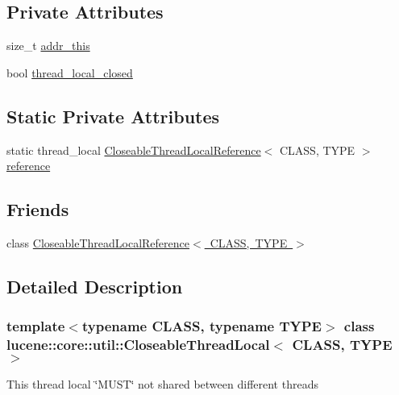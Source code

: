 \subsection*{Private Attributes}
\begin{DoxyCompactItemize}
\item 
size\+\_\+t \mbox{\hyperlink{classlucene_1_1core_1_1util_1_1CloseableThreadLocal_a69309dee1e58cf91dbcac2cacf382dcd}{addr\+\_\+this}}
\item 
bool \mbox{\hyperlink{classlucene_1_1core_1_1util_1_1CloseableThreadLocal_acd06e65a0e393a9dd64685a424868e35}{thread\+\_\+local\+\_\+closed}}
\end{DoxyCompactItemize}
\subsection*{Static Private Attributes}
\begin{DoxyCompactItemize}
\item 
static thread\+\_\+local \mbox{\hyperlink{classlucene_1_1core_1_1util_1_1CloseableThreadLocalReference}{Closeable\+Thread\+Local\+Reference}}$<$ C\+L\+A\+SS, T\+Y\+PE $>$ \mbox{\hyperlink{classlucene_1_1core_1_1util_1_1CloseableThreadLocal_ab649507ac8d8fd6af2eb3bfede2cc894}{reference}}
\end{DoxyCompactItemize}
\subsection*{Friends}
\begin{DoxyCompactItemize}
\item 
class \mbox{\hyperlink{classlucene_1_1core_1_1util_1_1CloseableThreadLocal_aa92c52d6e0ef7dba63e0ed7a8ef763cb}{Closeable\+Thread\+Local\+Reference$<$ C\+L\+A\+S\+S, T\+Y\+P\+E $>$}}
\end{DoxyCompactItemize}


\subsection{Detailed Description}
\subsubsection*{template$<$typename C\+L\+A\+SS, typename T\+Y\+PE$>$\newline
class lucene\+::core\+::util\+::\+Closeable\+Thread\+Local$<$ C\+L\+A\+S\+S, T\+Y\+P\+E $>$}

This thread local \char`\"{}\+M\+U\+S\+T\char`\"{} not shared between different threads 

